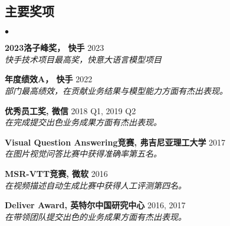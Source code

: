 \documentclass[margin,line]{res}
\newenvironment{list2}{
  \begin{list}{$\bullet$}{%
      \setlength{\itemsep}{0in}
      \setlength{\parsep}{0in} \setlength{\parskip}{0in}
      \setlength{\topsep}{0in} \setlength{\partopsep}{0in}
      \setlength{\leftmargin}{0.2in}}}{\end{list}}
\begin{document}
\begin{resume}
	\section{\sc 主要奖项}
	\begin{list2}
		\item \textbf{2023洛子峰奖， 快手} \hfill{2023}
		\\\emph{快手技术项目最高奖，快意大语言模型项目}
		\item \textbf{年度绩效A， 快手} \hfill{2022}
		\\\emph{部门最高绩效，在贡献业务结果与模型能力方面有杰出表现。}
		\item \textbf{优秀员工奖, 微信} \hfill{2018 Q1, 2019 Q2}
		\\\emph{在完成提交出色业务成果方面有杰出表现。}
		\item \textbf{Visual Question Answering竞赛, 弗吉尼亚理工大学} \hfill{2017}
		\\\emph{在图片视觉问答比赛中获得准确率第五名。}
		\item \textbf{MSR-VTT竞赛, 微软} \hfill{2016}
		\\\emph{在视频描述自动生成比赛中获得人工评测第四名。}
		\item \textbf{Deliver Award, 英特尔中国研究中心} \hfill{2016, 2017}
		\\\emph{在带领团队提交出色的业务成果方面有杰出表现。}

	\end{list2}

\end{resume}
\end{document}
